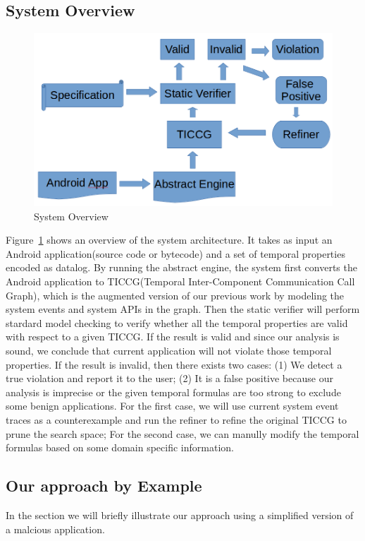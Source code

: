\documentclass{article}
\begin{document}
\subsection{System Overview}
\begin{figure}
\centerline{\includegraphics[scale=0.4]{sysgraph}}
\caption{System Overview}
\label{fig:one}
\end{figure}

Figure~\ref{fig:one} shows an overview of the system architecture.
It takes as input an Android application(source code or bytecode) 
and a set of temporal properties encoded as datalog. By running the 
abstract engine, the system first converts the Android application 
to TICCG(Temporal Inter-Component Communication Call Graph), 
which is the augmented version of our previous work\cite{apposcopy}
by modeling the system events and system APIs in the graph. 
Then the static verifier will perform stardard model checking to 
verify whether all the temporal properties are valid with respect 
to a given TICCG. If the result is valid and since our analysis is 
sound, we conclude that current application will not violate those
temporal properties. If the result is invalid, then there exists two
cases: (1) We detect a true violation and report it to the user; 
(2) It is a false positive because our analysis is imprecise or the 
given temporal formulas are too strong to exclude some benign applications.
For the first case, we will use current system event traces as a counterexample
\cite{clarkecegar} and  run the refiner to refine the original 
TICCG to prune the search space; For the second case, we can manully
modify the temporal formulas based on some domain specific information.

\subsection{Our approach by Example}
In the section we will briefly illustrate our approach using a simplified 
version of a malcious application.
\end{document}

